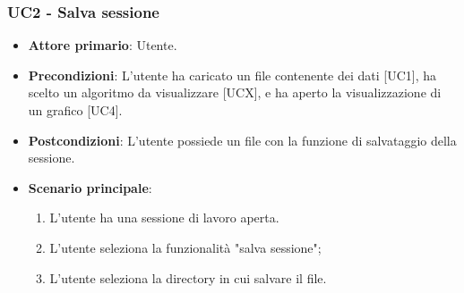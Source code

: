 \subsubsection{UC2 - Salva sessione}
\begin{itemize}
	\item \textbf{Attore primario}: Utente.
	\item \textbf{Precondizioni}: L'utente ha caricato un file contenente dei dati [UC1], ha scelto un algoritmo da visualizzare [UCX], e ha aperto la visualizzazione di un grafico [UC4].
	\item \textbf{Postcondizioni}: L'utente possiede un file con la funzione di salvataggio della sessione.
	\item \textbf{Scenario principale}:
		\begin{enumerate}
			\item L'utente ha una sessione di lavoro aperta.
			\item L'utente seleziona la funzionalità "salva sessione";
			\item L'utente seleziona la directory in cui salvare il file.
		\end{enumerate}
\end{itemize}